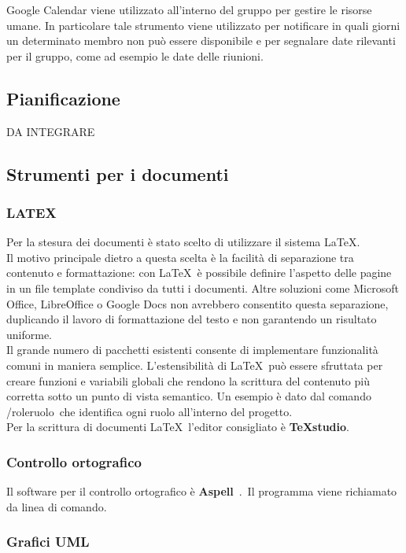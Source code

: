 Google Calendar viene utilizzato all’interno del gruppo per gestire le risorse umane. In
particolare tale strumento viene utilizzato per notificare in quali giorni un determinato
membro non può essere disponibile e per segnalare date rilevanti per il gruppo, come
ad esempio le date delle riunioni.
\subsection{Pianificazione}
DA INTEGRARE


\subsection{Strumenti per i documenti}
\subsubsection{LATEX} 
 
Per la stesura dei documenti è stato scelto di utilizzare il sistema \LaTeX.\\
Il motivo 
principale dietro a questa scelta è la facilità di separazione tra contenuto e formattazione: 
con \LaTeX\ è possibile definire l’aspetto delle pagine in un file template condiviso da tutti i documenti. Altre soluzioni come Microsoft Office, LibreOffice o Google Docs non 
avrebbero consentito questa separazione, duplicando il lavoro di formattazione del testo 
e non garantendo un risultato uniforme.\\
Il grande numero di pacchetti esistenti consente di implementare funzionalità comuni 
in maniera semplice. L’estensibilità di \LaTeX\ può essere sfruttata per creare funzioni e 
variabili globali che rendono la scrittura del contenuto più corretta sotto un punto di 
vista semantico. Un esempio è dato dal comando /role\textbraceleft ruolo\textbraceright\ che identifica ogni ruolo 
all’interno del progetto.\\
Per la scrittura di documenti \LaTeX\  l’editor consigliato è \textbf{TeXstudio}. 


\subsubsection{Controllo ortografico}

Il software per il controllo ortografico è \textbf{Aspell}\ .\ Il programma viene richiamato da linea di comando.


\subsubsection{Grafici UML} 

